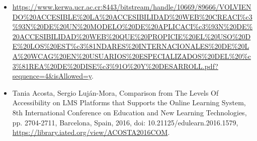 \documentclass{article}
\begin{document}
\begin{itemize}
    \item \url{https://www.kerwa.ucr.ac.cr:8443/bitstream/handle/10669/89666/VOLVIENDO%20ACCESIBLE%20LA%20ACCESIBILIDAD%20WEB%20CREACI%c3%93N%20DE%20UN%20MODELO%20DE%20APLICACI%c3%93N%20DE%20ACCESIBILIDAD%20WEB%20QUE%20PROPICIE%20EL%20USO%20DE%20LOS%20EST%c3%81NDARES%20INTERNACIONALES%20DE%20LA%20WCAG%20EN%20USUARIOS%20ESPECIALIZADOS%20DEL%20%c3%81REA%20DE%20DISE%c3%91O%20Y%20DESARROLL.pdf?sequence=4&isAllowed=y}.
    \item Tania Acosta, Sergio Luján-Mora, Comparison from The Levels Of Accessibility on LMS Platforms that Supports the Online Learning System, 8th International Conference on Education and New Learning Technologies, pp. 2704-2711, Barcelona, Spain, 2016, doi: 10.21125/edulearn.2016.1579, \url{https://library.iated.org/view/ACOSTA2016COM}.
\end{itemize}
\end{document}
